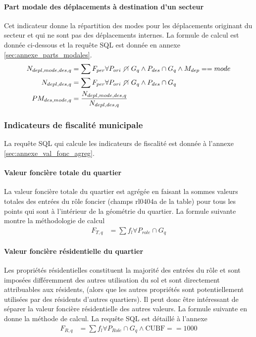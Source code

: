     \paragraph{Part modale des déplacements à destination d'un secteur}Cet indicateur donne la répartition des modes pour les déplacements originant du secteur et qui ne sont pas des déplacements internes. La formule de calcul est donnée ci-dessous et la requête SQL est donnée en annexe \ref{sec:annexe_parts_modales}.
    \begin{align}
        N_{depl,mode,des,q} &= \sum{F_{per}} \forall P_{ori}  \disjoint G_q \wedge P_{des} \cap G_q \wedge M_{dep}==mode \\
        N_{depl,des,q} &= \sum{F_{per}} \forall P_{ori} \disjoint G_q \wedge P_{des} \cap G_q \\
        PM_{des,mode,q} &= \frac{N_{depl,mode,des,q}}{N_{depl,des,q}}
    \end{align}
    \subsubsection{Indicateurs de fiscalité municipale}
    La requête SQL qui calcule les indicateurs de fiscalité est donnée à l'annexe \ref{sec:annexe_val_fonc_agreg}.
    \paragraph{Valeur foncière totale du quartier} La valeur foncière totale du quartier est agrégée en faisant la sommes valeurs totales des entrées du rôle foncier (champs rl0404a de la table) pour tous les points qui sont à l'intérieur de la géométrie du quartier. La formule suivante montre la méthodologie de calcul
    \begin{align}
        F_{T,q} &= \sum{f_{l}}\forall P_{role}\cap G_q
    \end{align}
    \paragraph{Valeur foncière résidentielle du quartier} Les propriétés résidentielles constituent la majorité des entrées du rôle et sont imposées différemment des autres utilisation du sol et sont directement attribuables aux résidents, (alors que les autres propriétés sont potentiellement utilisées par des résidents d'autres quartiers). Il peut donc être intéressant de séparer la valeur foncière résidentielle des autres valeurs. La formule suivante en donne la méthode de calcul. La requête SQL est détaillé à l'annexe 
    \begin{align}
        F_{R,q} &= \sum{f_{l}} \forall P_{Role} \cap G_q \wedge \text{CUBF} == 1000
    \end{align}
